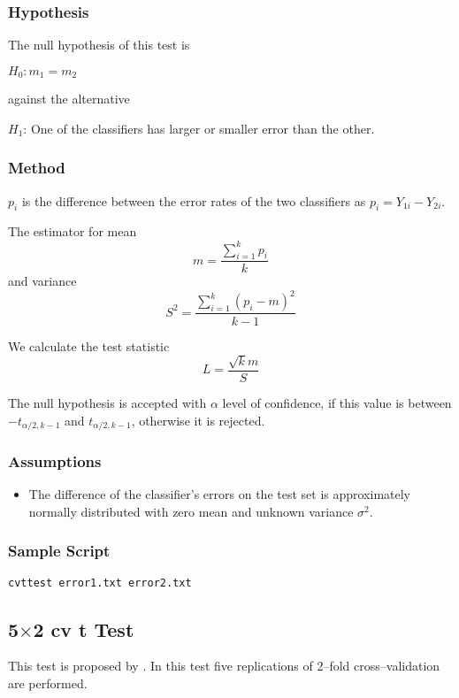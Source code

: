 \documentclass[a4paper,12pt]{book}
\begin{document}
\subsubsection{Hypothesis}
The null hypothesis of this test is  
\begin{center}
$H_0: m_1=m_2$
\end{center}
against the alternative
\begin{center}
$H_1$: One of the classifiers has larger or smaller error than the other.
\end{center}

\subsubsection{Method}
$p_i$ is the difference between the error rates of the two classifiers as
$p_i=Y_{1i}-Y_{2i}$. 

The estimator for mean
\begin{equation}
m=\frac{\sum_{i=1}^kp_i}{k}
\end{equation}
and variance
\begin{equation}
S^2=\frac{\sum_{i=1}^k(p_i-m)^2}{k-1}
\end{equation}

We calculate the test statistic
\begin{equation}
L=\frac{\sqrt{k}m}{S}
\end{equation}

The null hypothesis is accepted with $\alpha$ level of confidence, if this value is between $-t_{\alpha /2,k-1}$ and $t_{\alpha /2,k-1}$, otherwise it is rejected.

\subsubsection{Assumptions}
\begin{itemize}
\item The difference of the classifier's errors on the test set is approximately normally distributed
with zero mean and unknown variance $\sigma^2$.
\end{itemize}

\subsubsection{Sample Script}
\begin{verbatim}
cvttest error1.txt error2.txt
\end{verbatim}

\subsection{5$\times$2 cv t Test}
This test is proposed by \cite{dietterich98}. In this test five replications of 2--fold cross--validation are performed. 
\end{document}
